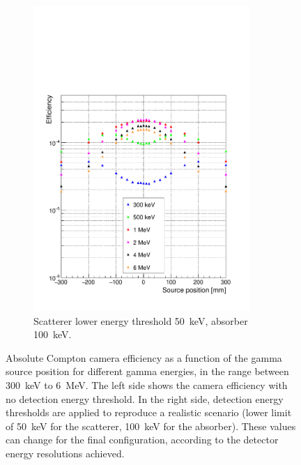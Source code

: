 \begin{figure} [!hbtp]
\begin{subfigure}[t]{.49\textwidth}
\includegraphics[width=0.9\textwidth]{03_GraphicFiles/chapter4_HTsimu/new/EffVSpos_CutSingle_simple.pdf}
\caption{Scatterer lower energy threshold 50~keV, absorber 100~keV.}
\label{chap4::fig::efficiency_EnSel}
\end{subfigure}
\caption{Absolute Compton camera efficiency as a function of the gamma source position for different gamma energies, in the range between 300~keV to 6~MeV. The left side shows the camera efficiency with no detection energy threshold. In the right side, detection energy thresholds are applied to reproduce a realistic scenario (lower limit of 50~keV for the scatterer, 100~keV for the absorber). These values can change for the final configuration, according to the detector energy resolutions achieved.}
\label{chap4::fig::efficiency_study}
\end{figure}

